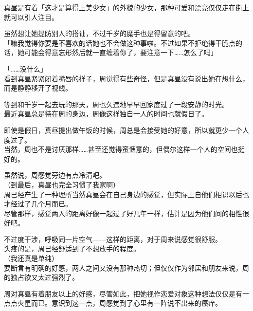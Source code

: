真昼是有着「这才是算得上美少女」的外貌的少女，那种可爱和漂亮仅仅走在街上就可以引人注目。

虽然想让她提防别人的搭讪，不过千岁的魔手也是得留意的吧。\\

「嘛我觉得你要是不喜欢的话她也不会做这种事啦。不过如果不拒绝得干脆点的话，她可能会得意忘形然后就一直缠着你了，要注意一下……怎么了吗」

「……没什么」\\

看到真昼紧紧闭着嘴唇的样子，周觉得有些奇怪，但是真昼没有说出她在想什么，而是静静移开了视线。\\

\vspace{2\baselineskip}

等到和千岁一起去玩的那天，周也久违地早早回家度过了一段安静的时光。\\

最近真昼总是待在周的身边，周像这样独自一人的时间也就假日了。

即使是假日，真昼提出做午饭的时候，周总是会接受她的好意，所以就更少一个人度过了。\\

当然，周也不是讨厌那样……甚至还觉得蛮惬意的，但偶尔这样一个人的空间也挺好的。

虽然说，周感觉旁边有点冷清吧。\\

（到最后，真昼也完全习惯了我家啊）\\

周已经产生了一种理所当然真昼会在自己身边的感觉，但实际上自他们相识以后也才经过了几个月而已。\\

尽管那样，感觉两人的距离好像一起过了好几年一样，估计是因为他们间的相性很好吧。

不过度干涉，呼吸同一片空气——这样的距离，对于周来说感觉很舒服。\\

%
头疼的是，周已经舒适到了不想放手的程度。\\

（我还真是单纯）\\

%
要断言有明确的好感，两人之间又没有那种热切；但仅仅作为邻居和朋友来说，周的独占欲又太过强烈了。

周对真昼有着朋友以上的好感，尽管如此，把她视作恋爱对象这种想法仅仅是有一点点火星而已。意识到这一点，周感觉到了心里有一阵说不出来的瘙痒。\\

